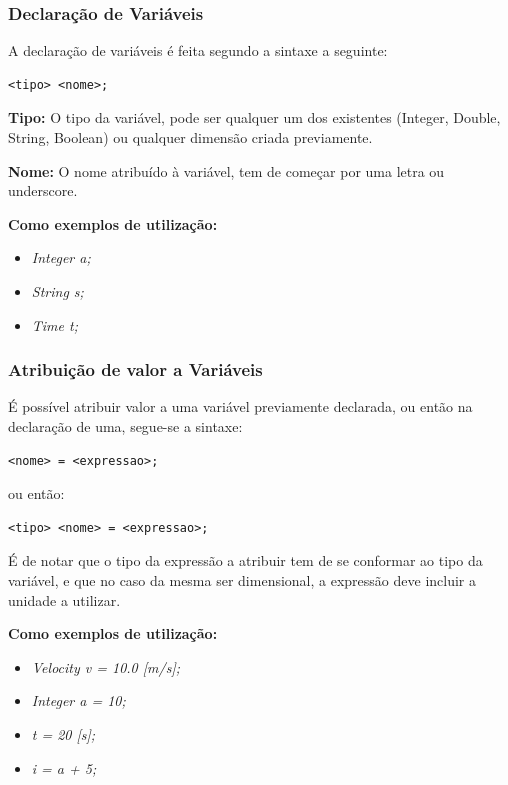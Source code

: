 \documentclass[10pt,portuguese]{article}
\begin{document}
\subsubsection{Declaração de Variáveis}
\par A declaração de variáveis é feita segundo a sintaxe a seguinte:
\begin{lstlisting}[numbers=none]
<tipo> <nome>;
\end{lstlisting}
\newline
\par \textbf{Tipo:} O tipo da variável, pode ser qualquer um dos existentes (Integer, Double, String, Boolean) ou qualquer dimensão criada previamente.
\par \textbf{Nome:} O nome atribuído à variável, tem de começar por uma letra ou underscore.
\newline
\par \textbf{Como exemplos de utilização:}
\begin{itemize}
    \item \textit{Integer a;}
    \item \textit{String s;}
    \item \textit{Time t;}
\end{itemize}

\subsubsection{Atribuição de valor a Variáveis}
\par É possível atribuir valor a uma variável previamente declarada, ou então na declaração de uma, segue-se a sintaxe:
\begin{lstlisting}[numbers=none]
<nome> = <expressao>;
\end{lstlisting}
\par ou então:
\begin{lstlisting}[numbers=none]
<tipo> <nome> = <expressao>;
\end{lstlisting}
\newline
\par É de notar que o tipo da expressão a atribuir tem de se conformar ao tipo da variável, e que no caso da mesma ser dimensional, a expressão deve incluir a unidade a utilizar.
\newline
\par \textbf{Como exemplos de utilização:}
\begin{itemize}
    \item \textit{Velocity v = 10.0 [m/s];}
    \item \textit{Integer a = 10;}
    \item \textit{t = 20 [s];}
    \item \textit{i = a + 5;}
\end{itemize}
\end{document}

